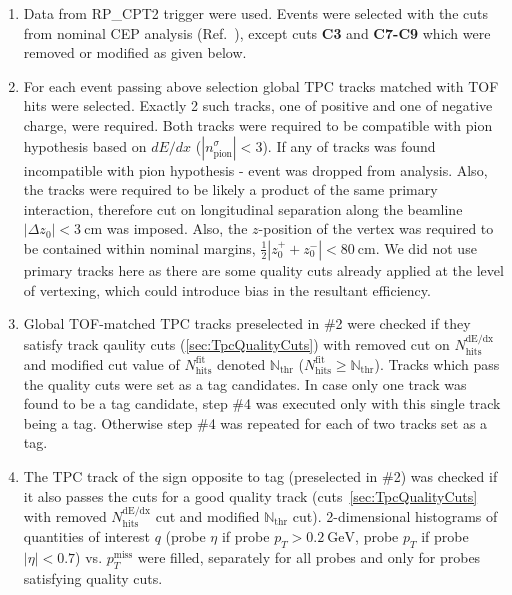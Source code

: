 \begin{enumerate}
 \item Data from RP\_CPT2 trigger were used. Events were selected with the cuts from nominal CEP analysis (Ref.~\cite{AnalysisNoteRafal}), except cuts \textbf{C3} and \textbf{C7-C9} which were removed or modified as given below.\\[-18pt]%
 \item For each event passing above selection global TPC tracks matched with TOF hits were selected. Exactly 2 such tracks, one of positive and one of negative charge, were required. Both tracks were required to be compatible with pion hypothesis based on $dE/dx$ ($|n^{\sigma}_{\text{pion}}|<3$). If any of tracks was found incompatible with pion hypothesis - event was dropped from analysis. Also, the tracks were required to be likely a product of the same primary interaction, therefore cut on longitudinal separation along the beamline $|\Delta z_{0}| < 3~\text{cm}$ was imposed. Also, the $z$-position of the vertex was required to be contained within nominal margins, $\frac{1}{2}|z_{0}^{+}+z_{0}^{-}| < 80~\text{cm}$. We did not use primary tracks here as there are some quality cuts already applied at the level of vertexing, which could introduce bias in the resultant efficiency.\\[-18pt]%
 \item Global TOF-matched TPC tracks preselected in \#2 were checked if they satisfy track qaulity cuts (\ref{sec:TpcQualityCuts}) with removed cut on $N_{\text{hits}}^{\text{dE/dx}}$ and modified cut value of $N_{\text{hits}}^{\text{fit}}$ denoted $\mathbb{N}_{\text{thr}}$ ($N_{\text{hits}}^{\text{fit}} \geq \mathbb{N}_{\text{thr}}$). Tracks which pass the quality cuts were set as a tag candidates. In case only one track was found to be a tag candidate, step \#4 was executed only with this single track being a tag. Otherwise step \#4 was repeated for each of two tracks set as a tag.\\[-18pt]%
 \item The TPC track of the sign opposite to tag (preselected in \#2) was checked if it also passes the cuts for a good quality track (cuts~\ref{sec:TpcQualityCuts} with removed $N_{\text{hits}}^{\text{dE/dx}}$ cut and modified $\mathbb{N}_{\text{thr}}$ cut). 2-dimensional histograms of quantities of interest $q$ (probe $\eta$ if probe $p_{T}>0.2~\text{GeV}$, probe $p_{T}$ if probe $|\eta|<0.7$) vs. $p_{T}^{\text{miss}}$ were filled, separately for all probes and only for probes satisfying quality cuts.\\[-18pt]%

\end{enumerate}
